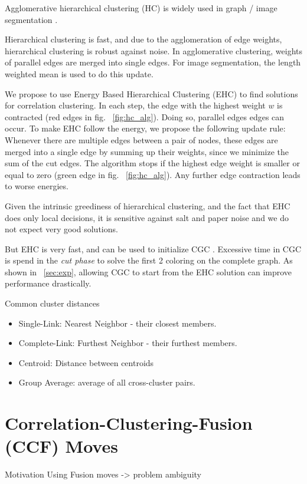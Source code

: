 \documentclass[10pt,twocolumn,letterpaper]{article}
\begin{document}
Agglomerative hierarchical clustering (HC) is widely used
in graph / image segmentation
\cite{arbelaez_2006}.



Hierarchical clustering is fast, and 
due to the agglomeration of edge weights, 
hierarchical clustering is robust against noise.
In agglomerative clustering, weights of
parallel edges are merged into single edges.
For image segmentation, the length
weighted mean is used to do this update.

We propose to use Energy Based Hierarchical Clustering (EHC) to find
solutions for correlation clustering.
In each step, the edge with the highest weight $w$ is
contracted (red edges in fig. ~\ref{fig:hc_alg}).
Doing so, parallel edges edges can occur.
To make EHC follow the energy, we propose 
the following update rule:
Whenever there are multiple edges between 
a pair of nodes, these edges are merged into a single edge
by summing up their weights, since we 
minimize the sum of the cut edges.
The algorithm stops if the highest edge weight is
smaller or equal to zero  (green edge in fig. ~\ref{fig:hc_alg}). Any further edge
contraction leads to worse energies.

Given the intrinsic greediness of hierarchical clustering, 
and the fact that EHC does only local decisions, it is 
sensitive against salt and paper noise 
and we do not expect very good solutions.

But EHC is very fast, and can be used to initialize
CGC \cite{beier_2014_cvpr}. Excessive time in CGC
is spend in the \emph{cut phase} to solve the 
first 2 coloring on the complete graph.
As shown in ~\ref{sec:exp},
allowing CGC to start from the EHC solution
can improve performance drastically.



%


Common cluster distances
\begin{itemize}
\item Single-Link: Nearest Neighbor - their closest members.
\item Complete-Link: Furthest Neighbor - their furthest members.
\item Centroid: Distance between centroids
\item Group Average: average of all cross-cluster pairs.
\end{itemize}

\section{Correlation-Clustering-Fusion (CCF) Moves}\label{sec:cc_fm}
Motivation Using Fusion moves -> problem ambiguity
\end{document}
